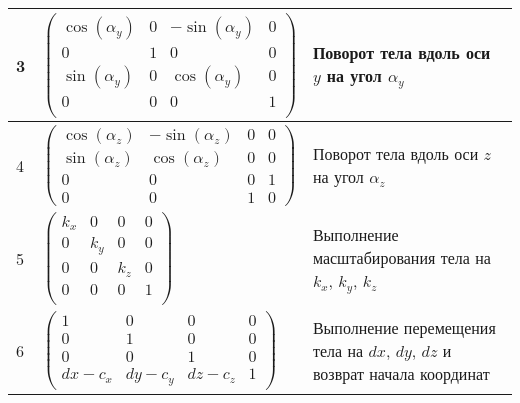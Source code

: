 \begin{center}
\begin{longtable}{|p{}|p{}|p{}|}
        \hline
        3            & $\begin{pmatrix}
                \cos(\alpha_y) & 0 & -\sin(\alpha_y) & 0 \\
                0              & 1 & 0               & 0 \\
                \sin(\alpha_y) & 0 & \cos(\alpha_y)  & 0 \\
                0              & 0 & 0               & 1 \\
            \end{pmatrix}$              & Поворот тела вдоль оси $y$ на угол $\alpha_y$                              \\
        \hline
        4            & $\begin{pmatrix}
                \cos(\alpha_z) & -\sin(\alpha_z) & 0 & 0 \\
                \sin(\alpha_z) & \cos(\alpha_z)  & 0 & 0 \\
                0              & 0               & 0 & 1 \\
                0              & 0               & 1 & 0
            \end{pmatrix}$              & Поворот тела вдоль оси $z$ на угол $\alpha_z$                              \\
        \hline
        5            & $\begin{pmatrix}
                k_x & 0   & 0   & 0 \\
                0   & k_y & 0   & 0 \\
                0   & 0   & k_z & 0 \\
                0   & 0   & 0   & 1 \\
            \end{pmatrix}$              & Выполнение масштабирования тела на $k_x$, $k_y$, $k_z$                     \\
        \hline
        6            & $\begin{pmatrix}
                1        & 0        & 0        & 0 \\
                0        & 1        & 0        & 0 \\
                0        & 0        & 1        & 0 \\
                dx - c_x & dy - c_y & dz - c_z & 1
            \end{pmatrix}$              & Выполнение перемещения тела на $dx$, $dy$, $dz$ и возврат начала координат \\


        \hline
    \end{longtable}
\end{center}
